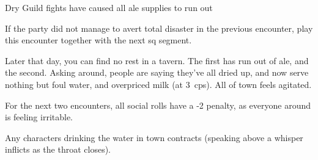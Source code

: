 \beardedalemaster

{\squash Dry}%
{Guild fights have caused all ale supplies to run out}%

If the party did not manage to avert total disaster in the previous encounter, play this encounter together with the next \gls{sq} \gls{segment}.

\begin{boxtext}

  Later that day, you can find no rest in a tavern.
  The first has run out of ale, and the second.
  Asking around, people are saying they've all dried up, and now serve nothing but foul water, and overpriced milk (at 3~\glspl{cp}).
  All of \gls{town} feels agitated.

\end{boxtext}

\noindent
For the next two encounters, all social rolls have a -2 penalty, as everyone around is feeling irritable.

Any characters drinking the water in \gls{town} contracts (speaking above a whisper inflicts  as the throat closes).
